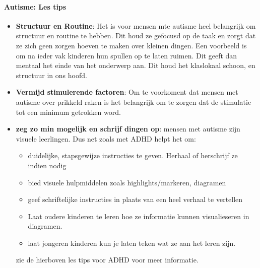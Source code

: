                 \bigskip
                \noindent\paragraph{Autisme: Les tips}
                    \begin{itemize}
                        \item \textbf{Structuur en Routine}\cite{autisme-teaching-them}:
                            Het is voor mensen mte autisme heel belangrijk om structuur en routine te hebben. Dit houd ze gefocusd op de taak en zorgt dat ze zich geen zorgen hoeven te maken over kleinen dingen. Een voorbeeld is om na ieder vak kinderen hun spullen op te laten ruimen. Dit geeft dan mentaal het einde van het onderwerp aan. Dit houd het klaslokaal schoon, en structuur in ons hoofd.
                            
                        \item \textbf{Vermijd stimulerende factoren}\cite{autisme-teaching-them}:
                            Om te voorkoment dat mensen met autisme over prikkeld raken is het belangrijk om te zorgen dat de stimulatie tot een minimum getrokken word.
                            
                        \item \textbf{zeg zo min mogelijk en schrijf dingen op}\cite{autisme-teaching-them}:
                            mensen met autisme zijn visuele leerlingen\cite{autisme-visual}. Dus net zoals met ADHD helpt het om:
                                \begin{itemize}
                                    \item duidelijke, stapsgewijze instructies te geven. Herhaal of herschrijf ze indien nodig
                                    \item bied visuele hulpmiddelen zoals highlights/markeren, diagramen 
                                    \item geef schriftelijke instructies in plaats van een heel verhaal te vertellen
                                    \item Laat oudere kinderen te leren hoe ze informatie kunnen visualieseren in diagramen.
                                    \item laat jongeren kinderen kun je laten teken wat ze aan het leren zijn. 
                            \end{itemize}
                            zie de hierboven les tips voor ADHD voor meer informatie.
                        

\end{itemize}
